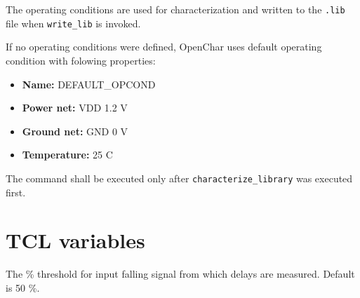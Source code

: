 \documentclass[12pt, a4paper]{article}
\begin{document}


The operating conditions are used for characterization and written to the
\texttt{.lib} file when \texttt{write_lib} is invoked.

If no operating conditions were defined, OpenChar uses default operating condition
with folowing properties:
\begin{itemize}
    \item{\textbf{Name:} DEFAULT_OPCOND}
    \item{\textbf{Power net:} VDD 1.2 V}
    \item{\textbf{Ground net:} GND 0 V}
    \item{\textbf{Temperature:} 25 C}
\end{itemize}







The command shall be executed only after \texttt{characterize_library} was
executed first.






\pagebreak
\section{TCL variables}\label{TCL variables}



The \% threshold for input falling signal from which delays are measured.
Default is 50 \%.


\end{document}
